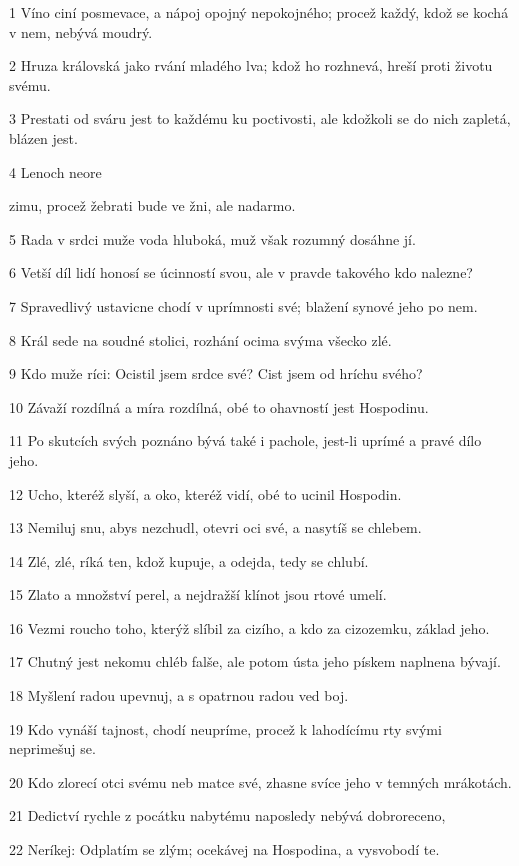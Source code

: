 \par 1 Víno ciní posmevace, a nápoj opojný nepokojného; procež každý, kdož se kochá v nem, nebývá moudrý.
\par 2 Hruza královská jako rvání mladého lva; kdož ho rozhnevá, hreší proti životu svému.
\par 3 Prestati od sváru jest to každému ku poctivosti, ale kdožkoli se do nich zapletá, blázen jest.
\par 4 Lenoch neore \par zimu, procež žebrati bude ve žni, ale nadarmo.
\par 5 Rada v srdci muže voda hluboká, muž však rozumný dosáhne jí.
\par 6 Vetší díl lidí honosí se úcinností svou, ale v pravde takového kdo nalezne?
\par 7 Spravedlivý ustavicne chodí v uprímnosti své; blažení synové jeho po nem.
\par 8 Král sede na soudné stolici, rozhání ocima svýma všecko zlé.
\par 9 Kdo muže ríci: Ocistil jsem srdce své? Cist jsem od hríchu svého?
\par 10 Závaží rozdílná a míra rozdílná, obé to ohavností jest Hospodinu.
\par 11 Po skutcích svých poznáno bývá také i pachole, jest-li uprímé a pravé dílo jeho.
\par 12 Ucho, kteréž slyší, a oko, kteréž vidí, obé to ucinil Hospodin.
\par 13 Nemiluj snu, abys nezchudl, otevri oci své, a nasytíš se chlebem.
\par 14 Zlé, zlé, ríká ten, kdož kupuje, a odejda, tedy se chlubí.
\par 15 Zlato a množství perel, a nejdražší klínot jsou rtové umelí.
\par 16 Vezmi roucho toho, kterýž slíbil za cizího, a kdo za cizozemku, základ jeho.
\par 17 Chutný jest nekomu chléb falše, ale potom ústa jeho pískem naplnena bývají.
\par 18 Myšlení radou upevnuj, a s opatrnou radou ved boj.
\par 19 Kdo vynáší tajnost, chodí neupríme, procež k lahodícímu rty svými neprimešuj se.
\par 20 Kdo zlorecí otci svému neb matce své, zhasne svíce jeho v temných mrákotách.
\par 21 Dedictví rychle z pocátku nabytému naposledy nebývá dobroreceno,
\par 22 Neríkej: Odplatím se zlým; ocekávej na Hospodina, a vysvobodí te.
